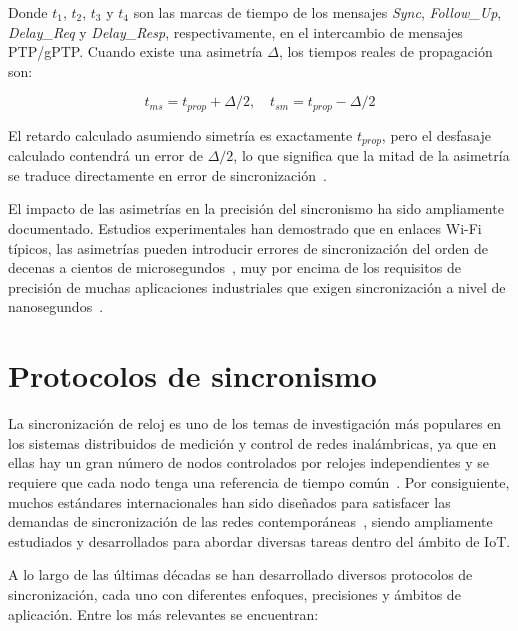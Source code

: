 Donde $t_1$, $t_2$, $t_3$ y $t_4$ son las marcas de tiempo de los mensajes \textit{Sync}, \textit{Follow\_Up}, \textit{Delay\_Req} y \textit{Delay\_Resp}, respectivamente, en el intercambio de mensajes PTP/gPTP. Cuando existe una asimetría $\Delta$, los tiempos reales de propagación son:

\begin{equation}
t_{ms} = t_{prop} + \Delta/2, \quad t_{sm} = t_{prop} - \Delta/2
\end{equation}

El retardo calculado asumiendo simetría es exactamente $t_{prop}$, pero el desfasaje calculado contendrá un error de $\Delta/2$, lo que significa que la mitad de la asimetría se traduce directamente en error de sincronización~\cite{exel2014}.

El impacto de las asimetrías en la precisión del sincronismo ha sido ampliamente documentado. Estudios experimentales han demostrado que en enlaces Wi-Fi típicos, las asimetrías pueden introducir errores de sincronización del orden de decenas a cientos de microsegundos~\cite{mahmood2014,ferrari2011}, muy por encima de los requisitos de precisión de muchas aplicaciones industriales que exigen sincronización a nivel de nanosegundos~\cite{seijo2022,romanov2021}.

\section{Protocolos de sincronismo}
\label{sec:1.5}

La sincronización de reloj es uno de los temas de investigación más populares en los sistemas distribuidos de medición y control de redes inalámbricas, ya que en ellas hay un gran número de nodos controlados por relojes independientes y se requiere que cada nodo tenga una referencia de tiempo común~\cite{zhang2024}. Por consiguiente, muchos estándares internacionales han sido diseñados para satisfacer las demandas de sincronización de las redes contemporáneas~\cite{balakrishnan2023}, siendo ampliamente estudiados y desarrollados para abordar diversas tareas dentro del ámbito de IoT.

A lo largo de las últimas décadas se han desarrollado diversos protocolos de sincronización, cada uno con diferentes enfoques, precisiones y ámbitos de aplicación. Entre los más relevantes se encuentran:


